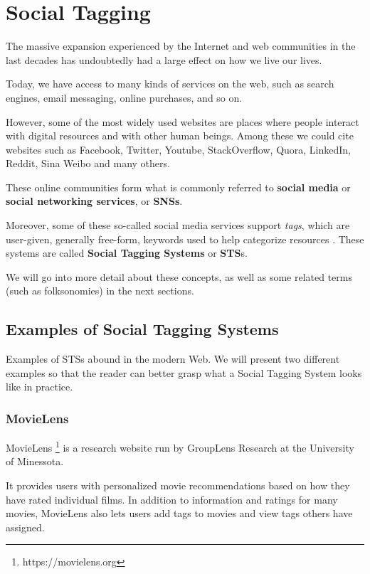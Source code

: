 \chapter{Social Tagging}\label{chap:social_tagging}

The massive expansion experienced by the Internet and web communities in the last decades has undoubtedly had a large effect on how we live our lives.

Today, we have access to many kinds of services on the web, such as search engines, email messaging, online purchases, and so on.

However, some of the most widely used websites are places where people interact with digital resources and with other human beings. Among these we could cite websites such as Facebook, Twitter, Youtube, StackOverflow, Quora, LinkedIn, Reddit, Sina Weibo and many others.

These online communities form what is commonly referred to \textbf{social media} or \textbf{social networking services}, or \textbf{SNSs}. \citep{obar_wildman_2015,hamburger_etal_2017}

Moreover, some of these so-called social media services support \textit{tags}, which are user-given, generally free-form, keywords used to help categorize resources \cite{mathes_2004}. These systems are called \textbf{Social Tagging Systems} or \textbf{STS}s.

We will go into more detail about these concepts, as well as some related terms (such as folksonomies) in the next sections.

\section{Examples of Social Tagging Systems}

Examples of STSs abound in the modern Web. We will present two different examples so that the reader can better grasp what a Social Tagging System looks like in practice.

\subsection{MovieLens}

MovieLens \footnote{https://movielens.org} is a research website run by GroupLens Research at the University of Minessota.

It provides users with personalized movie recommendations based on how they have rated individual films. In addition to information and ratings for many movies, MovieLens also lets users add tags to movies and view tags others have assigned.

